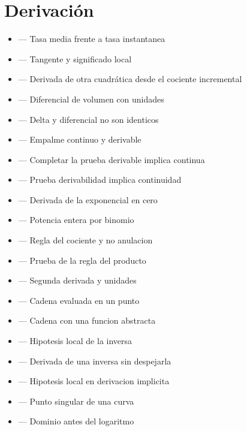 \documentclass[10pt,a4paper,oneside,openany]{book}
\begin{document}
\section*{Derivación}
\begin{itemize}
\item {} — Tasa media frente a tasa instantanea
\item {} — Tangente y significado local
\item {} — Derivada de otra cuadrática desde el cociente incremental
\item {} — Diferencial de volumen con unidades
\item {} — Delta y diferencial no son identicos
\item {} — Empalme continuo y derivable
\item {} — Completar la prueba derivable implica continua
\item {} — Prueba derivabilidad implica continuidad
\item {} — Derivada de la exponencial en cero
\item {} — Potencia entera por binomio
\item {} — Regla del cociente y no anulacion
\item {} — Prueba de la regla del producto
\item {} — Segunda derivada y unidades
\item {} — Cadena evaluada en un punto
\item {} — Cadena con una funcion abstracta
\item {} — Hipotesis local de la inversa
\item {} — Derivada de una inversa sin despejarla
\item {} — Hipotesis local en derivacion implicita
\item {} — Punto singular de una curva
\item {} — Dominio antes del logaritmo

\end{itemize}
\end{document}

